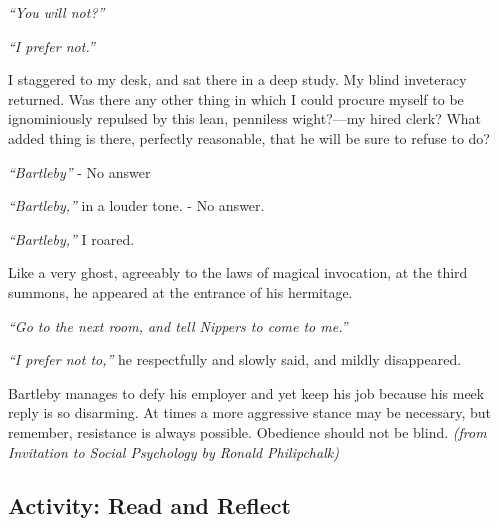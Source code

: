\documentclass[
]{book}
\begin{document}
\emph{``You will not?''}

\emph{``I prefer not.''}

I staggered to my desk, and sat there in a deep study. My blind inveteracy returned. Was there any other thing in which I could procure myself to be ignominiously repulsed by this lean, penniless wight?---my hired clerk? What added thing is there, perfectly reasonable, that he will be sure to refuse to do?

\emph{``Bartleby''} - No answer

\emph{``Bartleby,''} in a louder tone. - No answer.

\emph{``Bartleby,''} I roared.

Like a very ghost, agreeably to the laws of magical invocation, at the third summons, he appeared at the entrance of his hermitage.

\emph{``Go to the next room, and tell Nippers to come to me.''}

\emph{``I prefer not to,''} he respectfully and slowly said, and mildly disappeared.

Bartleby manages to defy his employer and yet keep his job because his meek reply is so disarming. At times a more aggressive stance may be necessary, but remember, resistance is always possible. Obedience should not be blind. \emph{(from Invitation to Social Psychology by Ronald Philipchalk)}

\hypertarget{activity-read-and-reflect-7}{%
\subsection*{Activity: Read and Reflect}\label{activity-read-and-reflect-7}}
\end{document}
